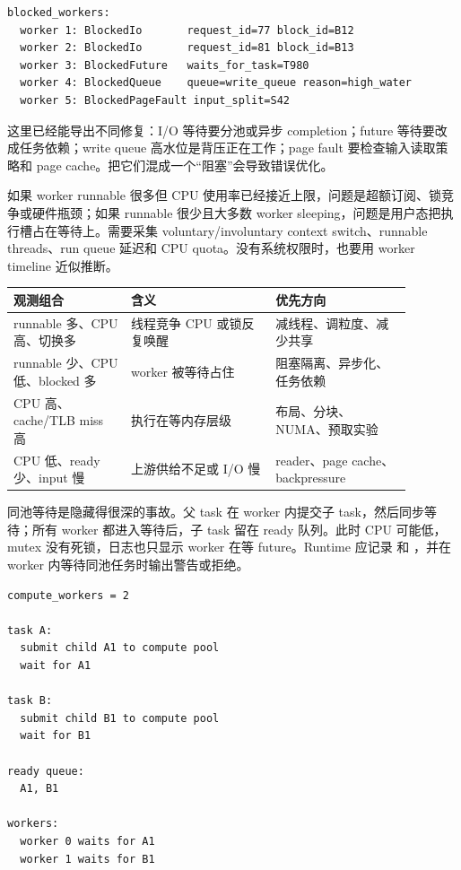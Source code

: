 \begin{lstlisting}[numbers=none,caption={等待原因分解示例}]
blocked_workers:
  worker 1: BlockedIo       request_id=77 block_id=B12
  worker 2: BlockedIo       request_id=81 block_id=B13
  worker 3: BlockedFuture   waits_for_task=T980
  worker 4: BlockedQueue    queue=write_queue reason=high_water
  worker 5: BlockedPageFault input_split=S42
\end{lstlisting}

这里已经能导出不同修复：I/O 等待要分池或异步 completion；future 等待要改成任务依赖；write queue 高水位是背压正在工作；page fault 要检查输入读取策略和 page cache。把它们混成一个“阻塞”会导致错误优化。

如果 worker runnable 很多但 CPU 使用率已经接近上限，问题是超额订阅、锁竞争或硬件瓶颈；如果 runnable 很少且大多数 worker sleeping，问题是用户态把执行槽占在等待上。需要采集 voluntary/involuntary context switch、runnable threads、run queue 延迟和 CPU quota。没有系统权限时，也要用 worker timeline 近似推断。

\begin{center}
\begin{tabular}{p{0.26\linewidth}p{0.32\linewidth}p{0.30\linewidth}}
\toprule
观测组合 & 含义 & 优先方向 \\
\midrule
runnable 多、CPU 高、切换多 & 线程竞争 CPU 或锁反复唤醒 & 减线程、调粒度、减少共享 \\
runnable 少、CPU 低、blocked 多 & worker 被等待占住 & 阻塞隔离、异步化、任务依赖 \\
CPU 高、cache/TLB miss 高 & 执行在等内存层级 & 布局、分块、NUMA、预取实验 \\
CPU 低、ready 少、input 慢 & 上游供给不足或 I/O 慢 & reader、page cache、backpressure \\
\bottomrule
\end{tabular}
\end{center}

同池等待是隐藏得很深的事故。父 task 在 worker 内提交子 task，然后同步等待；所有 worker 都进入等待后，子 task 留在 ready 队列。此时 CPU 可能低，mutex 没有死锁，日志也只显示 worker 在等 future。Runtime 应记录  和 ，并在 worker 内等待同池任务时输出警告或拒绝。

\begin{lstlisting}[numbers=none,caption={同池等待的最小反例}]
compute_workers = 2

task A:
  submit child A1 to compute pool
  wait for A1

task B:
  submit child B1 to compute pool
  wait for B1

ready queue:
  A1, B1

workers:
  worker 0 waits for A1
  worker 1 waits for B1
\end{lstlisting}

